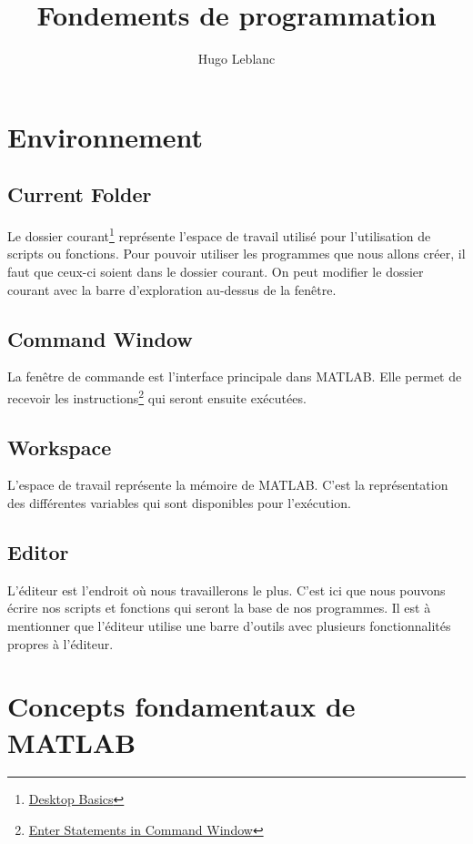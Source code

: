 \documentclass{tufte-handout}
\title{Fondements de programmation}
\author{Hugo Leblanc}
\begin{document}
\maketitle

\section{Environnement}
\subsection{Current Folder}
Le dossier courant\footnote{\href{https://www.mathworks.com/help/matlab/learn_matlab/desktop.html}{Desktop Basics}} représente l'espace de travail utilisé pour l'utilisation de scripts ou fonctions. Pour pouvoir utiliser les programmes que nous allons créer, il faut que ceux-ci soient dans le dossier courant. On peut modifier le dossier courant avec la barre d'exploration au-dessus de la fenêtre.
\subsection{Command Window}
La fenêtre de commande est l'interface principale dans MATLAB. Elle permet de recevoir les instructions\footnote{\href{https://www.mathworks.com/help/matlab/matlab_env/enter-statements-in-command-window.html}{Enter Statements in Command Window}} qui seront ensuite exécutées.
\subsection{Workspace}
L'espace de travail représente la mémoire de MATLAB. C'est la représentation des différentes variables qui sont disponibles pour l'exécution.
\subsection{Editor}
L'éditeur est l'endroit où nous travaillerons le plus. C'est ici que nous pouvons écrire nos scripts et fonctions qui seront la base de nos programmes. Il est à mentionner que l'éditeur utilise une barre d'outils avec plusieurs fonctionnalités propres à l'éditeur.

\section{Concepts fondamentaux de MATLAB}
\end{document}
